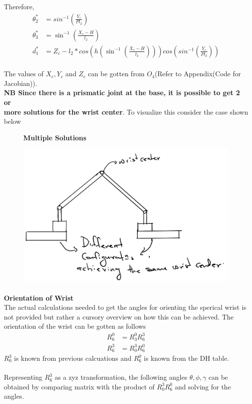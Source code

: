 \documentclass[12pt]{article}
\begin{document}
Therefore,
\begin{align}
  \theta_2^* &= sin^{-1}(\frac{Y_c}{Pl_2}) \\
  \theta_3^* &= \sin ^{-1}(\frac{X_c - H}{l_2})  \\
  d_1^* &= Z_c -l_2*cos(h(\sin ^{-1}(\frac{X_c - H}{l_2})))cos(sin^{-1}(\frac{Y_c}{Pl_2}))
\end{align}\\ 

The values of $X_c,Y_c$ and $Z_c$ can be gotten from $O_4$(Refer to Appendix(Code for Jacobian)).
\\
\textbf{NB Since there is a prismatic joint at the base, it is possible to get 2 or \\
more solutions for the wrist center}. To visualize this consider the case shown below

\begin{figure}[H]
    \centering
    \textbf{Multiple Solutions}\par\medskip
    \includegraphics[scale = 0.5]{multisol.png}\\[0.0 cm]	%
  \end{figure}
\paragraph{}

\textbf{Orientation of Wrist} \\
The actual calculations needed to get the angles for orienting the sperical wrist is not provided but rather a cursory overview on how this can be achieved.
The orientation of the wrist can be gotten as follows
\begin{align}
  R^0_6 &= R^0_3R^3_6 \\
  R^3_6 &= R^3_0R^0_6
\end{align}
$R^3_0$ is known  from previous calcuations and $R^0_6$ is known from the DH table. \\ \\
Representing $R^3_6$ as a zyz transformation, the following angles $\theta,\phi, \gamma$ can be obtained
by comparing matrix with the product of $R^3_0R^0_6$ and solving for the angles.  \\ \\
\end{document}
